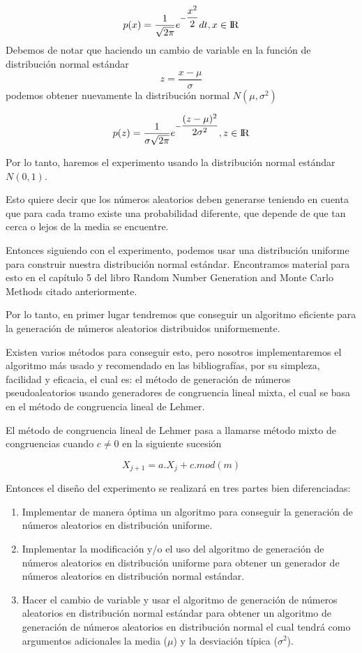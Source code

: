 \documentclass[conference,a4paper]{IEEEtran}
\begin{document}
$$p(x) = \dfrac {1}{\sqrt{2\pi}}
e^{-\dfrac{x^2}{2}} dt, x \in {\rm I\!R} $$
Debemos de notar que haciendo un cambio de variable en la funci\'on de distribuci\'on normal est\'andar $$z=\dfrac{x-\mu}{\sigma}$$ podemos obtener nuevamente la distribuci\'on normal $N(\mu,\sigma^2)$ 

$$p(z) = \dfrac {1}{\sigma\sqrt{2\pi}}
e^{-\dfrac{(z-\mu)^2}{2\sigma^2}} , z \in {\rm I\!R} $$

Por lo tanto, haremos el experimento usando la distribuci\'on normal est\'andar $N(0,1)$.

Esto quiere decir que los n\'umeros aleatorios deben generarse teniendo en cuenta que para cada tramo existe una probabilidad diferente, que depende de que tan cerca o lejos de la media se encuentre.

Entonces siguiendo con el experimento, podemos usar una distribuci\'on uniforme para construir nuestra distribuci\'on normal est\'andar. Encontramos material para esto en el cap\'itulo 5 del libro Random Number Generation and Monte Carlo Methods citado anteriormente.

Por lo tanto, en primer lugar tendremos que conseguir un algoritmo eficiente para la generaci\'on de n\'umeros aleatorios distribuidos uniformemente. 

Existen varios m\'etodos para conseguir esto, pero nosotros implementaremos el algoritmo m\'as usado y recomendado en las bibliograf\'ias, por su simpleza, facilidad y eficacia, el cual es: el m\'etodo de generaci\'on de n\'umeros pseudoaleatorios usando generadores de congruencia lineal mixta, el cual se basa en el m\'etodo de congruencia lineal de Lehmer.

El m\'etodo de congruencia lineal de Lehmer pasa a llamarse m\'etodo mixto de congruencias cuando $c \not= 0$ en la siguiente sucesi\'on

\begin{equation}
X_{j+1} = a.X_{j}+c.mod(m)
\end{equation}


Entonces el dise\~no del experimento se realizar\'a en tres partes bien diferenciadas:\\

\begin{enumerate}
	\item Implementar de manera \'optima un algoritmo para conseguir la generaci\'on de n\'umeros aleatorios en distribuci\'on uniforme. 
	\item Implementar la modificaci\'on y/o el uso del algoritmo de generaci\'on de n\'umeros aleatorios en distribuci\'on uniforme para obtener un generador de n\'umeros aleatorios en distribuci\'on normal est\'andar.
	\item Hacer el cambio de variable y usar el algoritmo de generaci\'on de n\'umeros aleatorios en distribuci\'on normal est\'andar para obtener un algoritmo de generaci\'on de n\'umeros aleatorios en distribuci\'on normal el cual tendr\'a como argumentos adicionales la media ($\mu$) y la desviaci\'on t\'ipica ($\sigma^2$).
	
\end{enumerate}
\end{document}
